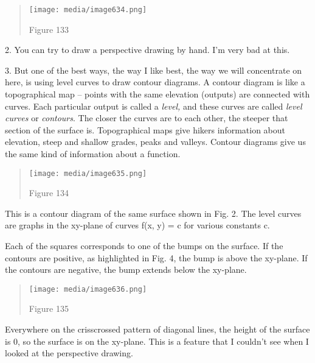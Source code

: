 \begin{quote}
\texttt{[image: media/image634.png]}

Figure 133
\end{quote}

2. You can try to draw a perspective drawing by hand. I'm very bad at
this.

3. But one of the best ways, the way I like best, the way we will
concentrate on here, is using level curves to draw contour diagrams. A
contour diagram is like a topographical map -- points with the same
elevation (outputs) are connected with curves. Each particular output is
called a \emph{level,} and these curves are called \emph{level curves}
or \emph{contours}. The closer the curves are to each other, the steeper
that section of the surface is. Topographical maps give hikers
information about elevation, steep and shallow grades, peaks and
valleys. Contour diagrams give us the same kind of information about a
function.

\begin{quote}
\texttt{[image: media/image635.png]}

Figure 134
\end{quote}

This is a contour diagram of the same surface shown in Fig. 2. The level
curves are graphs in the xy-plane of curves f(x, y) = c for various
constants c.

Each of the squares corresponds to one of the bumps on the surface. If
the contours are positive, as highlighted in Fig. 4, the bump is above
the xy-plane. If the contours are negative, the bump extends below the
xy-plane.

\begin{quote}
\texttt{[image: media/image636.png]}

Figure 135
\end{quote}

Everywhere on the crisscrossed pattern of diagonal lines, the height of
the surface is 0, so the surface is on the xy-plane. This is a feature
that I couldn't see when I looked at the perspective drawing.

